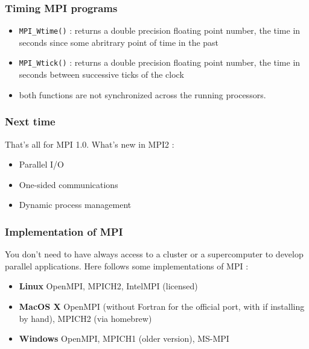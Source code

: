 \begin{frame}[containsverbatim]
\frametitle{Timing MPI programs}

\begin{itemize}
	\item {\verb+MPI_Wtime()+ : returns a double precision floating point number, the time in seconds since some abritrary point of time in the past }
	\item {\verb+MPI_Wtick()+ : returns a double precision floating point number, the time in seconds between successive ticks of the clock }
	\item { both functions are not synchronized across the running processors. }
\end{itemize}
\end{frame}


\begin{frame}[containsverbatim]
\frametitle{Next time}

That's all for MPI 1.0. What's new in MPI2 :

\begin{itemize}
	\item {Parallel I/O}
	\item {One-sided communications}
	\item {Dynamic process management}
\end{itemize}

\end{frame}


\begin{frame}
\frametitle{Implementation of MPI}	
You don't need to have always access to a cluster or a supercomputer to develop parallel applications. Here follows some implementations of MPI :
	\begin{itemize}
	\item {\textbf{Linux} OpenMPI, MPICH2, IntelMPI (licensed)}
	\item {\textbf{MacOS X} OpenMPI (without Fortran for the official port, with if installing by hand), MPICH2 (via homebrew)}
	\item {\textbf{Windows} OpenMPI, MPICH1 (older version), MS-MPI }
	\end{itemize}
\end{frame}



